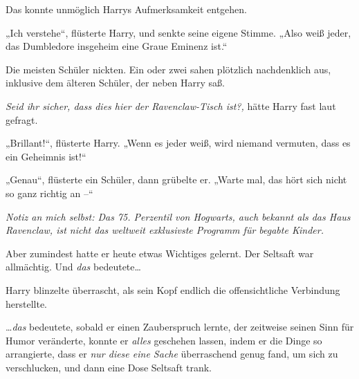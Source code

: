 Das konnte unmöglich Harrys Aufmerksamkeit entgehen.

„Ich verstehe“, flüsterte Harry, und senkte seine eigene Stimme. „Also weiß jeder, das Dumbledore insgeheim eine Graue Eminenz ist.“

Die meisten Schüler nickten. Ein oder zwei sahen plötzlich nachdenklich aus, inklusive dem älteren Schüler, der neben Harry saß.

\emph{Seid ihr sicher, dass dies hier der Ravenclaw-Tisch ist?,} hätte Harry fast laut gefragt.

„Brillant!“, flüsterte Harry. „Wenn es jeder weiß, wird niemand vermuten, dass es ein Geheimnis ist!“

„Genau“, flüsterte ein Schüler, dann grübelte er. „Warte mal, das hört sich nicht so ganz richtig an –“

\emph{Notiz an mich selbst: Das 75. Perzentil von Hogwarts, auch bekannt als das Haus Ravenclaw, ist nicht das weltweit exklusivste Programm für begabte Kinder.}

Aber zumindest hatte er heute etwas Wichtiges gelernt. Der Seltsaft war allmächtig. Und \emph{das} bedeutete…

Harry blinzelte überrascht, als sein Kopf endlich die offensichtliche Verbindung herstellte.

…\emph{das} bedeutete, sobald er einen Zauberspruch lernte, der zeitweise seinen Sinn für Humor veränderte, konnte er \emph{alles} geschehen lassen, indem er die Dinge so arrangierte, dass er \emph{nur diese eine Sache} überraschend genug fand, um sich zu verschlucken, und dann eine Dose Seltsaft trank.

